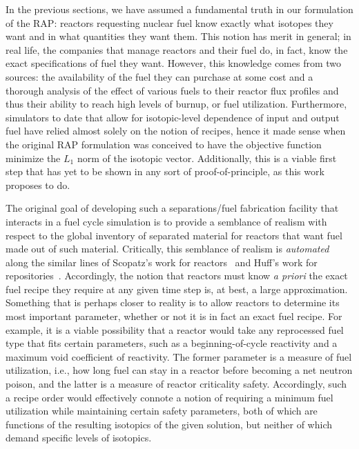 In the previous sections, we have assumed a fundamental truth in our formulation
of the RAP: reactors requesting nuclear fuel know exactly what isotopes they
want and in what quantities they want them. This notion has merit in general; in
real life, the companies that manage reactors and their fuel do, in fact, know
the exact specifications of fuel they want. However, this knowledge comes from
two sources: the availability of the fuel they can purchase at some cost and a
thorough analysis of the effect of various fuels to their reactor flux profiles
and thus their ability to reach high levels of burnup, or fuel
utilization. Furthermore, simulators to date that allow for isotopic-level
dependence of input and output fuel have relied almost solely on the notion of
recipes, hence it made sense when the original RAP formulation was conceived to
have the objective function minimize the $L_1$ norm of the isotopic
vector. Additionally, this is a viable first step that has yet to be shown in
any sort of proof-of-principle, as this work proposes to do.

The original goal of developing such a separations/fuel fabrication facility
that interacts in a fuel cycle simulation is to provide a semblance of realism
with respect to the global inventory of separated material for reactors that
want fuel made out of such material. Critically, this semblance of realism is
\textit{automated} along the similar lines of Scopatz's work for
reactors~\cite{scopatz_essential_2011} and Huff's work for
repositories~\cite{huff_integrated_2013}. Accordingly, the notion that reactors
must know \textit{a priori} the exact fuel recipe they require at any given time
step is, at best, a large approximation. Something that is perhaps closer to
reality is to allow reactors to determine its most important parameter, whether
or not it is in fact an exact fuel recipe. For example, it is a viable
possibility that a reactor would take any reprocessed fuel type that fits
certain parameters, such as a beginning-of-cycle reactivity and a maximum void
coefficient of reactivity. The former parameter is a measure of fuel
utilization, i.e., how long fuel can stay in a reactor before becoming a net
neutron poison, and the latter is a measure of reactor criticality
safety. Accordingly, such a recipe order would effectively connote a notion of
requiring a minimum fuel utilization while maintaining certain safety
parameters, both of which are functions of the resulting isotopics of the given
solution, but neither of which demand specific levels of isotopics.

